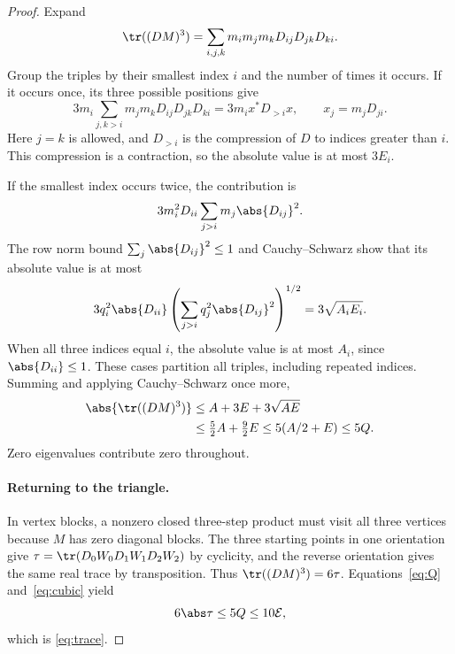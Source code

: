 \begin{proof}
Expand
\[
 \tr((DM)^3)=\sum_{i,j,k}m_im_jm_kD_{ij}D_{jk}D_{ki}.
\]
Group the triples by their smallest index \(i\) and the number of
times it occurs. If it occurs once, its three possible positions give
\[
 3m_i\sum_{j,k>i}m_jm_kD_{ij}D_{jk}D_{ki}
       =3m_i x^*D_{>i}x,\qquad x_j=m_jD_{ji}.
\]
Here \(j=k\) is allowed, and \(D_{>i}\) is the compression of \(D\)
to indices greater than \(i\). This compression is a contraction,
so the absolute value is at most \(3E_i\).

If the smallest index occurs twice, the contribution is
\[
 3m_i^2D_{ii}\sum_{j>i}m_j\abs{D_{ij}}^2.
\]
The row norm bound \(\sum_j\abs{D_{ij}}^2\le1\) and
Cauchy--Schwarz show that its absolute value is at most
\[
 3q_i^2\abs{D_{ii}}
       \left(\sum_{j>i}q_j^2\abs{D_{ij}}^2\right)^{1/2}
       =3\sqrt{A_iE_i}.
\]
When all three indices equal \(i\), the absolute value is at most
\(A_i\), since \(\abs{D_{ii}}\le1\).
These cases partition all triples, including repeated indices.
Summing and applying Cauchy--Schwarz once more,
\begin{equation}\label{eq:cubic}
 \begin{split}
 \abs{\tr((DM)^3)}
 &\le A+3E+3\sqrt{AE}\\
 &\le \tfrac52A+\tfrac92E
 \le 5(A/2+E)\le5Q.
 \end{split}
\end{equation}
Zero eigenvalues contribute zero throughout.

\paragraph{Returning to the triangle.}
In vertex blocks, a nonzero closed three-step product must visit all
three vertices because \(M\) has zero diagonal blocks. The three
starting points in one orientation give
\(\tau=\tr(D_0W_0D_1W_1D_2W_2)\) by cyclicity, and the reverse
orientation gives the same real trace by transposition.
Thus \(\tr((DM)^3)=6\tau\). Equations~\eqref{eq:Q}
and~\eqref{eq:cubic} yield
\[
 6\abs\tau\le5Q\le10\mathcal E,
\]
which is \eqref{eq:trace}.
\end{proof}

